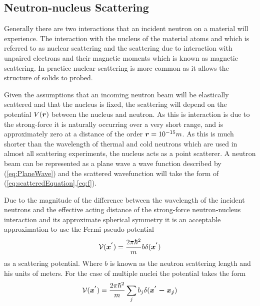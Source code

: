 \subsection{Neutron-nucleus Scattering}
Generally there are two interactions that an incident neutron on a material will experience. The interaction with the nucleus of the material atoms and which is referred to as nuclear scattering and the scattering due to interaction with unpaired electrons and their magnetic moments which is known as magnetic scattering. In practice nuclear scattering is more common as it allows the structure of solids to probed. 

Given the assumptions that an incoming neutron beam will be elastically scattered and that the nucleus is fixed, the scattering will depend on the potential $V(\mbox{\boldmath$r$})$ between the nucleus and neutron. As this is interaction is due to the strong-force it is naturally occurring over a very short range, and is approximately zero at a distance of the order $\mbox{\boldmath$r$}=10^{-15}m$. As this is much shorter than the wavelength of thermal and cold neutrons which are used in almost all scattering experiments, the nucleus acts as a point scatterer. A neutron beam can be represented as a plane wave a wave function described by (\ref{eq:PlaneWave}) and the scattered wavefunction will take the form of (\ref{eq:scatteredEquation},\ref{eq:f}).

Due to the magnitude of the difference between the wavelength of the incident neutrons and the effective acting distance of the strong-force neutron-nucleus interaction and its approximate spherical symmetry it is an acceptable approximation to use the Fermi pseudo-potential
\begin{equation}
\label{eq:FermiPseudoPotential}
\mathcal{V}(\mbox{\boldmath$x^{'}$}) = \frac{2\pi\hbar^2}{m}b\delta(\mbox{\boldmath$x^{'}$})
\end{equation}
 as a scattering potential. Where $b$ is known as the neutron scattering length and his units of meters. For the case of multiple nuclei the potential takes the form
 \begin{equation}
 \label{eq:MultipleNuclei}
 \mathcal{V}(\mbox{\boldmath$x^{'}$})  = \frac{2\pi\hbar^2}{m}\sum\limits_{j} b_j \delta(\mbox{\boldmath$x^{'}-x_j$})
 \end{equation}

